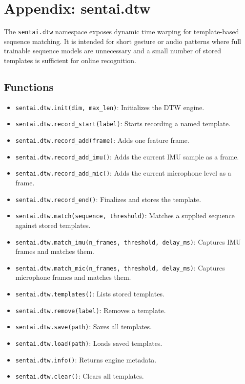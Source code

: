 \section{Appendix: sentai.dtw}\label{appendix-sentai.dtw}

The \texttt{sentai.dtw} namespace exposes dynamic time warping for
template-based sequence matching. It is intended for short gesture or
audio patterns where full trainable sequence models are unnecessary and
a small number of stored templates is sufficient for online recognition.

\subsection{Functions}\label{functions-19}

\begin{itemize}
\tightlist
\item
  \texttt{sentai.dtw.init(dim,\ max\_len)}: Initializes the DTW engine.
\item
  \texttt{sentai.dtw.record\_start(label)}: Starts recording a named
  template.
\item
  \texttt{sentai.dtw.record\_add(frame)}: Adds one feature frame.
\item
  \texttt{sentai.dtw.record\_add\_imu()}: Adds the current IMU sample as
  a frame.
\item
  \texttt{sentai.dtw.record\_add\_mic()}: Adds the current microphone
  level as a frame.
\item
  \texttt{sentai.dtw.record\_end()}: Finalizes and stores the template.
\item
  \texttt{sentai.dtw.match(sequence,\ threshold)}: Matches a supplied
  sequence against stored templates.
\item
  \texttt{sentai.dtw.match\_imu(n\_frames,\ threshold,\ delay\_ms)}:
  Captures IMU frames and matches them.
\item
  \texttt{sentai.dtw.match\_mic(n\_frames,\ threshold,\ delay\_ms)}:
  Captures microphone frames and matches them.
\item
  \texttt{sentai.dtw.templates()}: Lists stored templates.
\item
  \texttt{sentai.dtw.remove(label)}: Removes a template.
\item
  \texttt{sentai.dtw.save(path)}: Saves all templates.
\item
  \texttt{sentai.dtw.load(path)}: Loads saved templates.
\item
  \texttt{sentai.dtw.info()}: Returns engine metadata.
\item
  \texttt{sentai.dtw.clear()}: Clears all templates.
\end{itemize}


